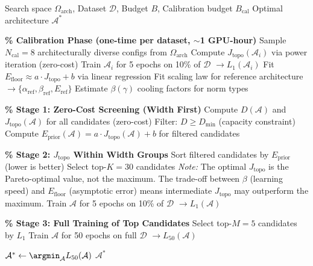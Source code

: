 \documentclass[11pt, a4paper]{article}
\theoremstyle{plain}
\begin{document}
\begin{algorithm}[htbp]
\caption{ThermoRG-AL: Thermodynamic Architecture Search}
\label{alg:thermorg-al}
\begin{algorithmic}[1]
\REQUIRE Search space $\Omega_{\mathrm{arch}}$, Dataset $\mathcal{D}$, Budget $B$, Calibration budget $B_{\mathrm{cal}}$
\ENSURE Optimal architecture $\mathcal{A}^*$

\STATE \textbf{\% Calibration Phase (one-time per dataset, $\sim$1 GPU-hour)}
\STATE Sample $N_{\mathrm{cal}} = 8$ architecturally diverse configs from $\Omega_{\mathrm{arch}}$
    \STATE Compute $J_{\mathrm{topo}}(\mathcal{A}_i)$ via power iteration (zero-cost)
    \STATE Train $\mathcal{A}_i$ for 5 epochs on 10\% of $\mathcal{D}$ $\rightarrow L_1(\mathcal{A}_i)$
\ENDFOR
\STATE Fit $E_{\mathrm{floor}} \approx a \cdot J_{\mathrm{topo}} + b$ via linear regression
\STATE Fit scaling law for reference architecture $\rightarrow \{\alpha_{\mathrm{ref}}, \beta_{\mathrm{ref}}, E_{\mathrm{ref}}\}$
\STATE Estimate $\beta(\gamma)$ cooling factors for norm types

\STATE \textbf{\% Stage 1: Zero-Cost Screening (Width First)}
\STATE Compute $D(\mathcal{A})$ and $J_{\mathrm{topo}}(\mathcal{A})$ for all candidates (zero-cost)
\STATE Filter: $D \geq D_{\min}$ (capacity constraint)
\STATE Compute $E_{\mathrm{prior}}(\mathcal{A}) = a \cdot J_{\mathrm{topo}}(\mathcal{A}) + b$ for filtered candidates

\STATE \textbf{\% Stage 2: $J_{\mathrm{topo}}$ Within Width Groups}
\STATE Sort filtered candidates by $E_{\mathrm{prior}}$ (lower is better)
\STATE Select top-$K = 30$ candidates
\STATE \emph{Note:} The optimal $J_{\mathrm{topo}}$ is the Pareto-optimal value, not the maximum. The trade-off between $\beta$ (learning speed) and $E_{\mathrm{floor}}$ (asymptotic error) means intermediate $J_{\mathrm{topo}}$ may outperform the maximum.
    \STATE Train $\mathcal{A}$ for 5 epochs on 10\% of $\mathcal{D}$ $\rightarrow L_1(\mathcal{A})$
\ENDFOR

\STATE \textbf{\% Stage 3: Full Training of Top Candidates}
\STATE Select top-$M = 5$ candidates by $L_1$
    \STATE Train $\mathcal{A}$ for 50 epochs on full $\mathcal{D}$ $\rightarrow L_{50}(\mathcal{A})$
\ENDFOR

\STATE $\mathcal{A}^* \leftarrow \argmin_{\mathcal{A}} L_{50}(\mathcal{A})$
\RETURN $\mathcal{A}^*$
\end{algorithmic}
\end{algorithm}
\end{document}
